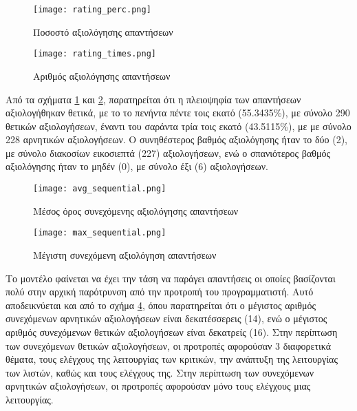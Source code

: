 \begin{figure}[H]
  \begin{center}
    \texttt{[image: rating\_perc.png]}
    \caption{Ποσοστό αξιολόγησης απαντήσεων}
  \end{center}
  \label{fig:RatingPerc}
\end{figure}

\begin{figure}[H]
  \begin{center}
    \texttt{[image: rating\_times.png]}
    \caption{Αριθμός αξιολόγησης απαντήσεων}
  \end{center}
  \label{fig:RatingTimes}
\end{figure}

Από τα σχήματα \ref{fig:RatingPerc} και \ref{fig:RatingTimes},
παρατηρείται ότι η πλειοψηφία των απαντήσεων αξιολογήθηκαν θετικά, με το
το πενήντα πέντε τοις εκατό (55.3435\%), με σύνολο 290 θετικών
αξιολογήσεων, έναντι του σαράντα τρία τοις εκατό (43.5115\%), με με
σύνολο 228 αρνητικών αξιολογήσεων. Ο συνηθέστερος βαθμός αξιολόγησης
ήταν το δύο (2), με σύνολο διακοσίων εικοσιεπτά (227) αξιολογήσεων, ενώ
ο σπανιότερος βαθμός αξιολόγησης ήταν το μηδέν (0), με σύνολο έξι (6)
αξιολογήσεων.

\begin{figure}[H]
  \begin{center}
    \texttt{[image: avg\_sequential.png]}
    \caption{Μέσος όρος συνεχόμενης αξιολόγησης απαντήσεων}
  \end{center}
  \label{fig:AverageSequential}
\end{figure}

\begin{figure}[H]
  \begin{center}
    \texttt{[image: max\_sequential.png]}
    \caption{Μέγιστη συνεχόμενη αξιολόγηση απαντήσεων}
  \end{center}
  \label{fig:MaxSequential}
\end{figure}

Το μοντέλο φαίνεται να έχει την τάση να παράγει απαντήσεις οι οποίες
βασίζονται πολύ στην αρχική παρότρυνση από την προτροπή του
προγραμματιστή. Αυτό αποδεικνύεται και από το σχήμα
\ref{fig:MaxSequential}, όπου παρατηρείται ότι ο μέγιστος αριθμός
συνεχόμενων αρνητικών αξιολογήσεων είναι δεκατέσσερεις (14), ενώ ο
μέγιστος αριθμός συνεχόμενων θετικών αξιολογήσεων είναι δεκατρείς (16).
Στην περίπτωση των συνεχόμενων θετικών αξιολογήσεων, οι προτροπές
αφορούσαν 3 διαφορετικά θέματα, τους ελέγχους της λειτουργίας των
κριτικών, την ανάπτυξη της λειτουργίας των λιστών, καθώς και τους
ελέγχους της. Στην περίπτωση των συνεχόμενων αρνητικών αξιολογήσεων, οι
προτροπές αφορούσαν μόνο τους ελέγχους μιας λειτουργίας.

